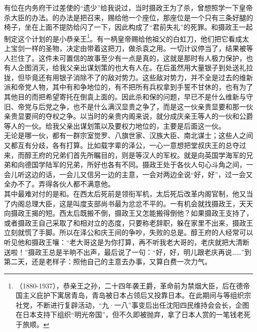 有位在内务府干过差使的“遗少”给我说过，当时摄政王为了杀，曾想照学一下皇帝杀大臣的办法。的办法是把召来，赐给他一个座位，那座位是一个只有三条好腿的椅子，坐在上面不提防给闪了一下，因此构成了“君前失礼”的死罪。和摄政王一起制定这个计划的是小恭亲王\footnote{（1880-1937），恭亲王之孙，二十四年袭王爵，革命前为禁烟大臣，后在德帝国主义庇护下寓居青岛，青岛被日本占领后又投靠日本。在此期间与等组织宗社党，不断进行复辟活动，“九·一八”事变后出任沈阳四民维持会会长，企图在日本支持下组织“明光帝国”，但不久即被抛弃，拿了日本人赏的一笔钱老死于旅顺。}。有一柄皇帝赐给他祖父的白虹刀，他们把它看成太上宝剑一样的圣物，决定由带着这把刀，做杀袁之用。一切计议停当了，结果被等人拦住了。这件未可置信的故事至少有一点是真的，这就是那时有人极力保护，也有人企图消灭，给我父亲出谋划策的也大有人在。在后虽然用大量银子到处送礼拉拢，但毕竟还有用银子消除不了的敌对势力。这些敌对势力，并不全是过去的维新派和帝党人物，其中有和争地位的，有不把所有兵权拿到手誓不甘休的，也有为了其他目的而把希望寄托在倒袁上面的。因此杀和保的问题，早已不是什么维新与守旧、帝党与后党之争，也不是什么满汉显贵之争了，而是这一伙亲贵显要和那一伙亲贵显要间的夺权之争。以当时的亲贵内阁来说，就分成庆亲王等人的一伙和公爵等人的一伙。给我父亲出谋划策以及要权力地位的，主要是后面这一伙。\\

无论是哪一伙，都有一群宗室觉罗、八旗世家、汉族大臣、南北谋士；这些人之间又都互有分歧，各有打算。比如载字辈的泽公，一心一意想把堂叔庆王的总夺过来，而醇王府的兄弟们首先所瞩目的，则是等汉人的军权。就是向英国学海军的兄弟和向德国学陆军的兄弟，所好也各有不同。摄政王处于各伙人句心斗角之间，一会儿听这边的话，一会儿又信另一边的主意，一会对两边全说“好，好”，过一会又全办不了。弄得各伙人都不满意他。\\

其中最难对付的是和。在西太后死前是领衔军机，太后死后改革内阁官制，他又当了内阁总理大臣，这是叫度支部尚书最为忿忿不平的。一有机会就找摄政王，天天向摄政王揭的短。西太后既搬不倒，摄政王又怎能搬得倒他？如果摄政王支持了，或者摄政王自己采取了和相对立的态度，只要称老辞职，躲在家里不出来，摄政王立刻就慌了手脚。所以在泽公和庆王间的争吵，失败的总是。醇王府的人经常可以听见他和摄政王嚷：“老大哥这是为你打算，再不听我老大哥的，老庆就把大清断送啦！”摄政王总是半晌不出声，最后说了一句：“好，好，明儿跟老庆再说……”到第二天，还是老样子：照他自己的主意去办事，又算白费一次力气。\\

